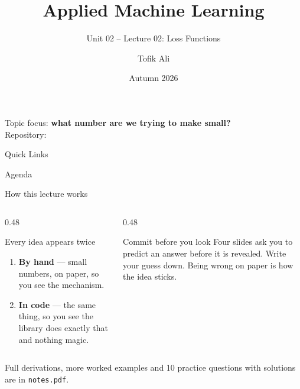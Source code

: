 \documentclass[aspectratio=169]{beamer}
\title[Applied Machine Learning]{Applied Machine Learning}
\subtitle{Unit 02 -- Lecture 02: Loss Functions}
\author{Tofik Ali}
\institute{School of Computer Science, UPES Dehradun}
\date{Autumn 2026}
\begin{document}
\UPESCoverFrame
\setcounter{framenumber}{0}

\begin{frame}
  \titlepage
  \vspace{0.3em}
  \begin{center}
    \footnotesize Topic focus: \textbf{what number are we trying to make small?}\\[0.25em]
    \footnotesize Repository: \texttt{\AMLRepoURL}
  \end{center}
  \slidesources{\AMLUnitIISources}
\end{frame}

\begin{frame}{Quick Links}
  \centering
  \hyperlink{sec:what}{}\hspace{0.5em}
  \hyperlink{sec:reg}{}\hspace{0.5em}
  \hyperlink{sec:clf}{}\hspace{0.5em}
  \hyperlink{sec:margin}{}\hspace{0.5em}
  \hyperlink{sec:choose}{}\hspace{0.5em}
  \hyperlink{sec:summary}{}
\end{frame}

\begin{frame}{Agenda}
  \tableofcontents
\end{frame}

\begin{frame}{How this lecture works}
  \begin{columns}[T]
    \begin{column}{0.48\textwidth}
      \begin{block}{Every idea appears twice}
        \begin{enumerate}
          \item \textbf{By hand} --- small numbers, on paper, so you see the
            mechanism.
          \item \textbf{In code} --- the same thing, so you see the library does
            exactly that and nothing magic.
        \end{enumerate}
      \end{block}
    \end{column}
    \begin{column}{0.48\textwidth}
      \begin{alertblock}{Commit before you look}
        Four slides ask you to predict an answer before it is revealed. Write
        your guess down. Being wrong on paper is how the idea sticks.
      \end{alertblock}
    \end{column}
  \end{columns}
  \vspace{0.4em}
  \begin{center}
    \small Full derivations, more worked examples and 10 practice questions
    with solutions are in \texttt{notes.pdf}.
  \end{center}
\end{frame}
\end{document}
